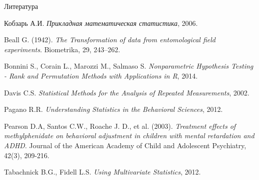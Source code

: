\documentclass[9pt,pdf,utf8,hyperref={unicode},aspectratio=169]{beamer}
\begin{document}
\begin{frame}{Литература}
{{     Кобзарь А.И. \textit{Прикладная математическая статистика}, 2006.     
		
		\vspace{5pt}
		
     Beall G. (1942). \textit{The Transformation of data from entomological field experiments}. Biometrika, 29, 243–262.
		
		\vspace{5pt}
		
	 Bonnini S., Corain L., Marozzi M., Salmaso S. \textit{Nonparametric Hypothesis Testing - Rank and Permutation Methods with Applications in R}, 2014.     
		
		\vspace{5pt}
		
     Davis C.S. \textit{Statistical Methods for the Analysis of Repeated Measurements}, 2002.
		
		\vspace{5pt}
			
	 Pagano R.R. \textit{Understanding Statistics in the Behavioral Sciences}, 2012.
		
		\vspace{5pt}
	
     Pearson D.A, Santos C.W., Roache J. D., et al. (2003). \textit{Treatment effects of methylphenidate on behavioral adjustment in children with mental retardation and ADHD}. Journal of the American Academy of Child and Adolescent Psychiatry, 42(3), 209-216. 
		
		\vspace{5pt}
		
     Tabachnick B.G., Fidell L.S. \textit{Using Multivariate Statistics}, 2012.
    }
	}
\end{frame}
\end{document}
